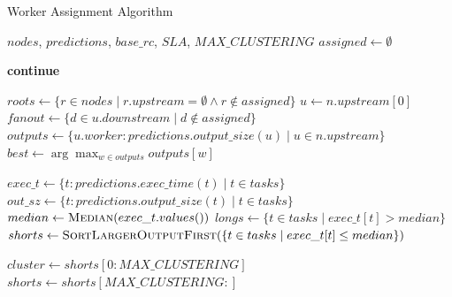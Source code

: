 \begin{algorithm}
    \caption{Worker Assignment Algorithm}
    \label{alg:worker_assignment}
    \small
    \begin{algorithmic}[1]
    \Require $nodes$, $predictions$, $base\_rc$, $SLA$, $MAX\_CLUSTERING$
    \State $assigned \gets \emptyset$
    
            \State \textbf{continue}
        \EndIf
        
         
            \State $roots \gets \{r \in nodes \mid r.upstream = \emptyset \land r \notin assigned\}$
            \State {}
         
            \State $u \gets n.upstream[0]$
                \State {} 
            \Else {}
                \State $fanout \gets \{d \in u.downstream \mid d \notin assigned\}$
                \State {}
            \EndIf
        \Else {}
            \State $outputs \gets \{u.worker: predictions.output\_size(u) \mid u \in n.upstream\}$
            \State $best \gets \arg\max_{w \in outputs} outputs[w]$
            \State {}
        \EndIf
    \EndFor
    
    \Statex
    
            \Return
        \EndIf
        
        \State $exec\_t \gets \{t: predictions.exec\_time(t) \mid t \in tasks\}$
        \State $out\_sz \gets \{t: predictions.output\_size(t) \mid t \in tasks\}$
        \State $median \gets \textsc{Median}(exec\_t.values())$
        \State $longs \gets \{t \in tasks \mid exec\_t[t] > median\}$
        \State $shorts \gets \textsc{SortLargerOutputFirst}(\{t \in tasks \mid exec\_t[t] \leq median\})$
        
        \Statex
        \State {}
            \State $cluster \gets shorts[0:MAX\_CLUSTERING]$
            \State {}
            \State $shorts \gets shorts[MAX\_CLUSTERING:]$
        \EndIf
        

\end{algorithmic}
\end{algorithm}
